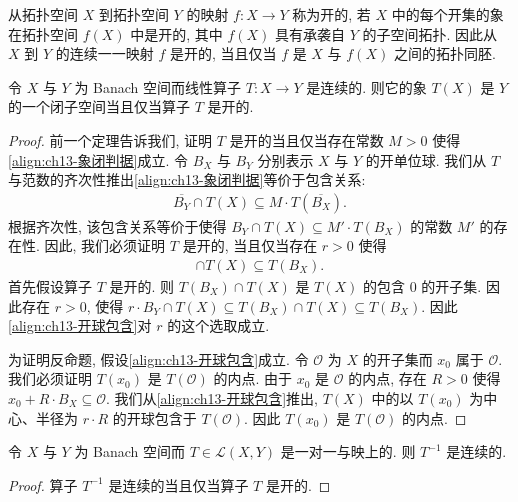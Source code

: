 \documentclass[../../main.tex]{subfiles}
\begin{document}
从拓扑空间 $X$ 到拓扑空间 $Y$ 的映射 $f:X\to Y$ 称为开的, 若 $X$ 中的每个开集的象在拓扑空间 $f(X)$ 中是开的, 其中 $f(X)$ 具有承袭自 $Y$ 的子空间拓扑. 因此从 $X$ 到 $Y$ 的连续一一映射 $f$ 是开的, 当且仅当 $f$ 是 $X$ 与 $f(X)$ 之间的拓扑同胚.

\begin{theorem}[开映射定理]\label{theorem:ch13-开映射}
令 $X$ 与 $Y$ 为 Banach 空间而线性算子 $T:X\to Y$ 是连续的. 则它的象 $T(X)$ 是 $Y$ 的一个闭子空间当且仅当算子 $T$ 是开的.
\end{theorem}

\begin{proof}
前一个定理告诉我们, 证明 $T$ 是开的当且仅当存在常数 $M>0$ 使得\eqref{align:ch13-象闭判据}成立. 令 $B_{X}$ 与 $B_{Y}$ 分别表示 $X$ 与 $Y$ 的开单位球. 我们从 $T$ 与范数的齐次性推出\eqref{align:ch13-象闭判据}等价于包含关系:
\begin{align*}
\overline{B_{Y}}\cap T(X)\subseteq M\cdot T(\overline{B_{X}}).
\end{align*}
根据齐次性, 该包含关系等价于使得 $B_{Y}\cap T(X)\subseteq M'\cdot T(B_{X})$ 的常数 $M'$ 的存在性. 因此, 我们必须证明 $T$ 是开的, 当且仅当存在 $r>0$ 使得
\begin{align}
[r\cdot B_{Y}]\cap T(X)\subseteq T(B_{X}).\label{align:ch13-开球包含}
\end{align}
首先假设算子 $T$ 是开的. 则 $T(B_{X})\cap T(X)$ 是 $T(X)$ 的包含 $0$ 的开子集. 因此存在 $r>0$, 使得 $r\cdot B_{Y}\cap T(X)\subseteq T(B_{X})\cap T(X)\subseteq T(B_{X})$. 因此\eqref{align:ch13-开球包含}对 $r$ 的这个选取成立.

为证明反命题, 假设\eqref{align:ch13-开球包含}成立. 令 $\mathcal{O}$ 为 $X$ 的开子集而 $x_{0}$ 属于 $\mathcal{O}$. 我们必须证明 $T(x_{0})$ 是 $T(\mathcal{O})$ 的内点. 由于 $x_{0}$ 是 $\mathcal{O}$ 的内点, 存在 $R>0$ 使得 $x_{0}+R\cdot B_{X}\subseteq\mathcal{O}$. 我们从\eqref{align:ch13-开球包含}推出, $T(X)$ 中的以 $T(x_{0})$ 为中心、半径为 $r\cdot R$ 的开球包含于 $T(\mathcal{O})$. 因此 $T(x_{0})$ 是 $T(\mathcal{O})$ 的内点.
\end{proof}

\begin{corollary}\label{corollary:ch13-逆连续}
令 $X$ 与 $Y$ 为 Banach 空间而 $T\in\mathcal{L}(X,Y)$ 是一对一与映上的. 则 $T^{-1}$ 是连续的.
\end{corollary}

\begin{proof}
算子 $T^{-1}$ 是连续的当且仅当算子 $T$ 是开的.
\end{proof}
\end{document}
